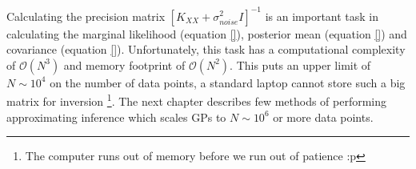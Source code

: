Calculating the precision matrix $[K_{XX}+ \sigma_{noise}^{2}I]^{-1}$ is an important task in calculating the marginal likelihood (equation \ref{}), posterior mean (equation \ref{}) and covariance (equation \ref{}). Unfortunately, this task has a computational complexity of $\mathcal{O}\left ( N^{3} \right )$ and memory footprint of $\mathcal{O}\left ( N^{2} \right )$. This puts an upper limit of $N \sim 10^4$ on the number of data points, a standard laptop cannot store such a big matrix for inversion \footnote{The computer runs out of memory before we run out of patience :p}. The next chapter describes few methods of performing approximating inference which scales GPs to $N \sim 10^6$ or more data points. 